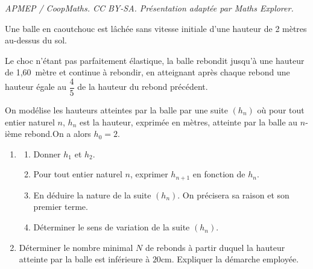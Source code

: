 \documentclass[10pt]{article}
\begin{document}
\noindent\textit{APMEP / CoopMaths. CC BY-SA. Présentation adaptée par Maths Explorer.}\par\medskip
\medskip

Une balle en caoutchouc est lâchée sans vitesse initiale d'une hauteur de 2 mètres au-dessus du sol.

Le choc n'étant pas parfaitement élastique, la balle rebondit jusqu'à une hauteur de
1,60~mètre et continue à rebondir, en atteignant après chaque rebond une hauteur égale au
$\dfrac{4}{5}$ de la hauteur du rebond précédent.

On modélise les hauteurs atteintes par la balle par une suite $\left(h_n\right)$ où pour tout entier naturel $n$, $h_n$ est la hauteur, exprimée en mètres, atteinte par la balle au $n$-ième  rebond.On a alors $h_0 = 2$.

\medskip

\begin{enumerate}
\item 
	\begin{enumerate}
		\item Donner $h_1$ et $h_2$.
		\item Pour tout entier naturel $n$, exprimer $h_{n+1}$ en fonction de $h_n$.
		\item En déduire la nature de la suite $\left(h_n\right)$. On précisera sa raison et son premier terme. 
		\item Déterminer le sens de variation de la suite $\left(h_n\right)$.
	\end{enumerate}
\item  Déterminer le nombre minimal $N$ de rebonds à partir duquel la hauteur atteinte par la balle est inférieure à $20$cm. Expliquer la démarche employée.
\end{enumerate}

\bigskip
\end{document}

